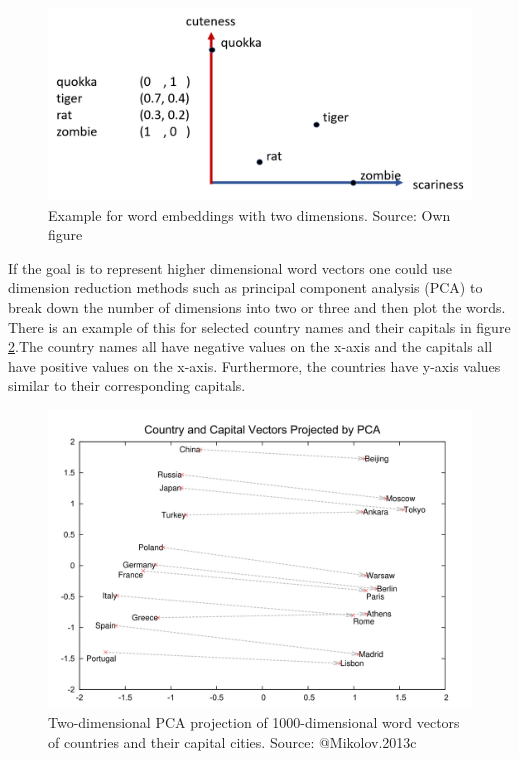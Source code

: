 \documentclass[]{krantz}
\begin{document}
\begin{figure}
\includegraphics[width=\textwidth]{figures/01-01-foundations-applications-of-modern-NLP/01-01_word_embeddings_1} \caption{Example for word embeddings with two dimensions. Source: Own figure}\label{fig:word-embedding1}
\end{figure}

If the goal is to represent higher dimensional word vectors one could use dimension reduction methods such as principal component analysis (PCA) to break down the number of dimensions into two or three and then plot the words. There is an example of this for selected country names and their capitals in figure \ref{fig:word-embedding2}.The country names all have negative values on the x-axis and the capitals all have positive values on the x-axis. Furthermore, the countries have y-axis values similar to their corresponding capitals.

\begin{figure}
\includegraphics[width=\textwidth]{figures/01-01-foundations-applications-of-modern-NLP/01-01_word_embeddings_2} \caption{Two-dimensional PCA projection of 1000-dimensional word vectors of countries and their capital cities. Source: @Mikolov.2013c}\label{fig:word-embedding2}
\end{figure}
\end{document}
